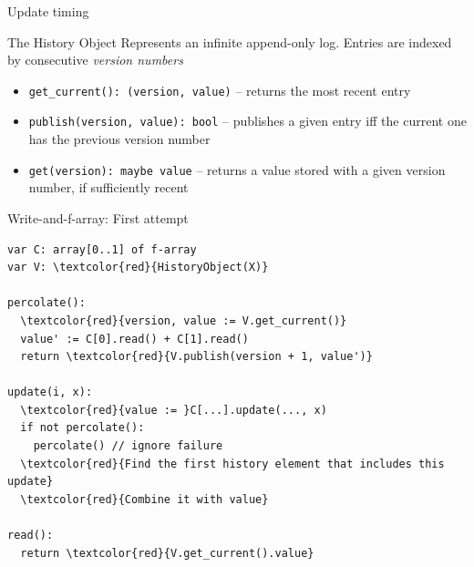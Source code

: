 \documentclass{beamer}
\begin{document}
\begin{frame}{Update timing}
\end{frame}

\begin{frame}[fragile]{The History Object}
Represents an infinite append-only log. Entries are indexed by consecutive \emph{version numbers}
\begin{itemize}
\item \verb+get_current(): (version, value)+ -- returns the most recent entry
\item \verb+publish(version, value): bool+ -- publishes a given entry iff the current one has the previous version number
\item \verb+get(version): maybe value+ -- returns a value stored with a given version number, if sufficiently recent
\end{itemize}
\end{frame}

\begin{frame}[fragile]{Write-and-f-array: First attempt}
\begin{Verbatim}
var C: array[0..1] of f-array
var V: \textcolor{red}{HistoryObject(X)}

percolate():
  \textcolor{red}{version, value := V.get_current()}
  value' := C[0].read() + C[1].read()
  return \textcolor{red}{V.publish(version + 1, value')}

update(i, x):
  \textcolor{red}{value := }C[...].update(..., x)
  if not percolate():
    percolate() // ignore failure
  \textcolor{red}{Find the first history element that includes this update}
  \textcolor{red}{Combine it with value}

read():
  return \textcolor{red}{V.get_current().value}
\end{Verbatim}
\end{frame}
\end{document}
